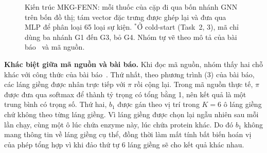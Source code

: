 \documentclass[conference]{IEEEtran}
\renewcommand{\hl}[1]{#1}
\renewcommand{\colorbox}[2]{#2}
\begin{document}
\begin{figure}[H]
\centering
{}
\caption{\hl{Kiến trúc MKG-FENN: mỗi thuốc của cặp đi qua bốn nhánh GNN trên bốn đồ thị; tám vector đặc trưng
được ghép lại và đưa qua MLP để phân loại 65 loại sự kiện.}
$^{*}$Ở cold-start (Task~2, 3), mã chỉ dùng ba nhánh G1 đến G3, bỏ G4. Nhóm tự vẽ theo mô tả của bài báo~\cite{mkgfenn} và mã nguồn.}
\label{fig:fenn}
\end{figure}

\textbf{\hl{Khác biệt giữa mã nguồn và bài báo.}} \hl{Khi đọc mã nguồn, nhóm thấy hai chỗ khác với công thức của bài báo}\colorbox{yellow}{~\cite{mkgfenn}}\hl{.
Thứ nhất, theo phương trình (3) của bài báo, các láng giềng được nhân trực tiếp với}
\colorbox{yellow}{$\pi$}
\hl{rồi cộng lại. Trong mã nguồn thực tế,}
\colorbox{yellow}{$\pi$}
\hl{được đưa qua softmax để thành tỷ trọng có tổng bằng 1, nên kết quả là một trung bình có trọng số.
Thứ hai,}
\colorbox{yellow}{$b_1$}
\hl{được gán theo vị trí trong}
\colorbox{yellow}{$K=6$}
\hl{ô láng giềng chứ không theo từng láng giềng. Vì láng giềng được chọn lại ngẫu nhiên sau mỗi lần chạy,
cùng một ô lúc chứa enzyme này, lúc chứa protein khác. Do đó}
\colorbox{yellow}{$b_1$}
\hl{không mang thông tin về láng giềng cụ thể, đồng thời làm mất tính bất biến hoán vị của phép tổng hợp vì
khi đảo thứ tự 6 láng giềng sẽ cho kết quả khác nhau.}
\end{document}
